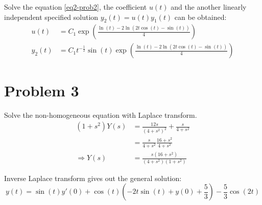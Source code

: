 \documentclass[utf8]{ctexart}
\begin{document}
Solve the equation \ref{eq2-prob2}, the coefficient \(u(t)\) and the another linearly independent specified solution \(y_2(t)=u(t)y_1(t)\) can be obtained:
\begin{equation}
	\begin{aligned}
		u(t)   & =C_1 \exp\left(\frac{\ln (t)-2 \ln (2 t \cos (t)-\sin (t))}{4}\right)                          \\
		y_2(t) & =C_1 t^{-\frac{1}{2}}\sin (t) \exp\left(\frac{\ln (t)-2 \ln (2 t \cos (t)-\sin (t))}{4}\right)
	\end{aligned}
\end{equation}

\section{Problem 3}

Solve the non-homogeneous equation with Laplace transform.
\begin{equation}
	\begin{aligned}
		(1+s^{2})Y(s)    & =\frac{12s}{(4+s^{2})^{2}}+\frac{s}{4+s^{2}} \\
		                 & =\frac{s}{4+s^{2}} \frac{16+s^{2}}{4+s^{2}}  \\
		\Rightarrow Y(s) & =\frac{s(16+s^{2})}{(4+s^{2})(1+s^{2})}
	\end{aligned}
\end{equation}

Inverse Laplace transform gives out the general solution:
\begin{equation}
	y(t)=\sin (t) y'(0)+\cos (t) \left(-2 t \sin (t)+y(0)+\frac{5}{3}\right)-\frac{5}{3}\cos (2 t)
\end{equation}
\end{document}
